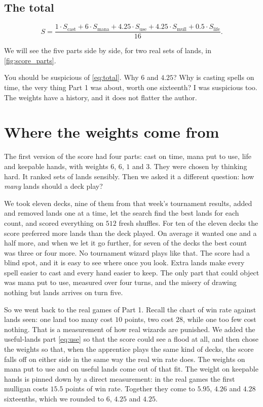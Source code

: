 \documentclass[
    a4paper,
    DIV=13,
    abstract=true,
    numbers=noenddot
]{scrartcl}
\begin{document}
\subsection{The total}
\begin{equation}\label{eq:total}
  S=\frac{1\cdot S_{\mathrm{cast}}+6\cdot S_{\mathrm{mana}}+4.25\cdot S_{\mathrm{use}}+4.25\cdot S_{\mathrm{mull}}+0.5\cdot S_{\mathrm{life}}}{16}.
\end{equation}

We will see the five parts side by side, for two real sets of lands, in \cref{fig:score_parts}.

You should be suspicious of \eqref{eq:total}. Why $6$ and $4.25$? Why is casting spells on time, the very thing Part 1 was about, worth one sixteenth? I was suspicious too. The weights have a history, and it does not flatter the author.

\section{Where the weights come from}
The first version of the score had four parts: cast on time, mana put to use, life and keepable hands, with weights $6$, $6$, $1$ and $3$. They were chosen by thinking hard. It ranked sets of lands sensibly. Then we asked it a different question: how \emph{many} lands should a deck play?

We took eleven decks, nine of them from that week's tournament results, added and removed lands one at a time, let the search find the best lands for each count, and scored everything on $512$ fresh shuffles. For ten of the eleven decks the score preferred more lands than the deck played. On average it wanted one and a half more, and when we let it go further, for seven of the decks the best count was three or four more. No tournament wizard plays like that. The score had a blind spot, and it is easy to see where once you look. Extra lands make every spell easier to cast and every hand easier to keep. The only part that could object was mana put to use, measured over four turns, and the misery of drawing nothing but lands arrives on turn five.

So we went back to the real games of Part 1. Recall the chart of win rate against lands seen: one land too many cost $10$ points, two cost $28$, while one too few cost nothing. That is a measurement of how real wizards are punished. We added the useful-lands part \eqref{eq:use} so that the score could see a flood at all, and then chose the weights so that, when the apprentice plays the same kind of decks, the score falls off on either side in the same way the real win rate does. The weights on mana put to use and on useful lands come out of that fit. The weight on keepable hands is pinned down by a direct measurement: in the real games the first mulligan costs $15.5$ points of win rate. Together they come to $5.95$, $4.26$ and $4.28$ sixteenths, which we rounded to $6$, $4.25$ and $4.25$.
\end{document}
